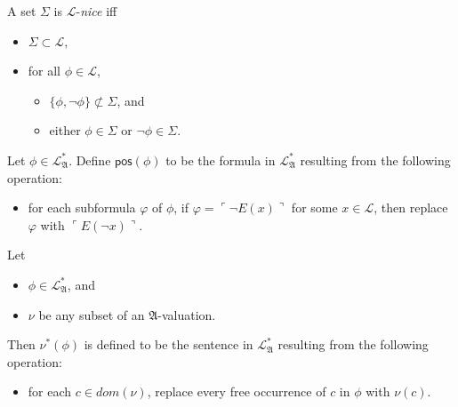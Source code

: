 \documentclass[12pt]{article}
\numberwithin{equation}{section}
\begin{document}
\begin{defi}\label{lnice}
A set $\Sigma$ is $\mathcal{L}$-\emph{nice} iff 
\begin{itemize}
    \item $\Sigma \subset \mathcal{L}$, 
    \item for all $\phi \in \mathcal{L}$, 
    \begin{itemize}[label=$\circ$]
        \item $\{\phi, \neg \phi\} \not\subset \Sigma$, and
        \item either $\phi \in \Sigma$ or $\neg \phi \in \Sigma$.
    \end{itemize} 
\end{itemize}
\end{defi}

\begin{defi}
Let $\phi\in \mathcal{L}^{*}_{\mathfrak{A}}$. Define $\mathsf{pos}(\phi)$ to be the formula in $\mathcal{L}^{*}_{\mathfrak{A}}$ resulting from the following operation:
\begin{itemize}
    \item for each subformula $\varphi$ of $\phi$, if $\varphi = \ulcorner \neg E(x) \urcorner$ for some $x \in \mathcal{L}$, then replace $\varphi$ with $\ulcorner E(\neg x) \urcorner$.
\end{itemize}
\end{defi}

\begin{defi}
Let 
\begin{itemize}
    \item $\phi\in \mathcal{L}^{*}_{\mathfrak{A}}$, and
    \item $\nu$ be any subset of an $\mathfrak{A}$-valuation.
\end{itemize}
Then $\nu^*(\phi)$ is defined to be the sentence in $\mathcal{L}^{*}_{\mathfrak{A}}$ resulting from the following operation:
\begin{itemize}
    \item for each $c \in dom(\nu)$, replace every free occurrence of $c$ in $\phi$ with $\nu(c)$.
\end{itemize}
\end{defi}
\end{document}

